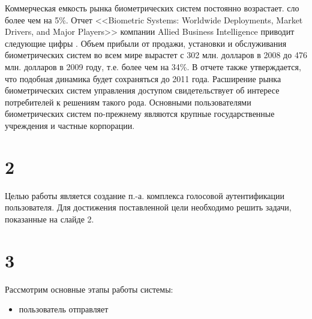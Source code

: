 



Коммерческая емкость рынка биометрических систем постоянно возрастает. 
сло более чем на 5\%. Отчет <<Biometric Systems:
Worldwide Deployments, Market Drivers, and Major Players>> компании Allied
Business Intelligence приводит следующие цифры \cite{ABI02Trends}. Объем прибыли
от продажи, установки и обслуживания биометрических систем во всем мире вырастет
с 302 млн. долларов в 2008 до 476 млн. долларов в 2009 году, т.е. более чем на
34\%. В отчете также утверждается, что подобная динамика будет сохраняться до
2011 года. Расширение рынка биометрических систем управления доступом
свидетельствует об интересе потребителей к решениям такого рода. Основными
пользователями биометрических систем по-прежнему являются крупные
государственные учреждения и частные корпорации.

\section{2} Целью работы является создание п.-а. комплекса голосовой аутентификации
пользователя. Для достижения поставленной цели необходимо решить задачи,
показанные на слайде 2.

\section{3} Рассмотрим основные этапы работы системы:
\begin{itemize}
\item пользователь отправляет
\end{itemize}




